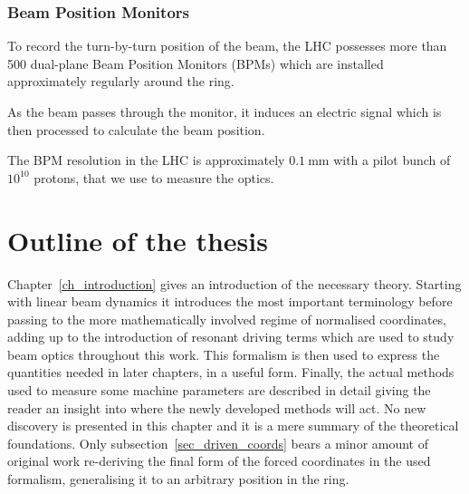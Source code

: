 
\subsubsection{Beam Position Monitors}

To record the turn-by-turn position of the beam, the LHC possesses more than 500 dual-plane
Beam Position Monitors (BPMs) \cite{koutchouk} which are installed approximately regularly around the ring. 

As the beam passes through the monitor, it induces an electric signal which is then processed
to calculate the beam position.

The BPM resolution in the LHC is approximately $\SI{0.1}{\milli\metre}$ \cite{fcc-bpm,wp2-bpm} with a pilot bunch of
$10^{10}$ protons, that we use to measure the optics.


\section{Outline of the thesis}

Chapter~\ref{ch_introduction} gives an introduction of the necessary theory. Starting with linear beam 
dynamics it introduces the most important terminology before passing to the more mathematically involved
regime of normalised coordinates, adding up to the introduction of resonant driving terms which are used
to study beam optics throughout this work.
This formalism is then used to express the quantities needed in later chapters, in a useful form. 
Finally, the actual methods used to measure some machine parameters are described in detail giving the
reader an insight into where the newly developed methods will act.
No new discovery is presented in this chapter and it is a mere summary of the theoretical foundations.
Only subsection~\ref{sec_driven_coords} bears a minor amount of original work re-deriving the final form
of the forced coordinates in the used formalism, generalising it to an arbitrary position in the ring.

